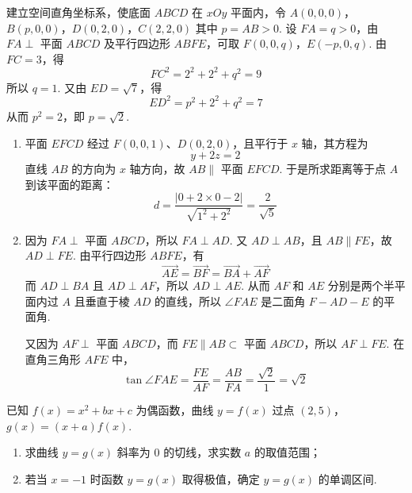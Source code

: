 \begin{solution}
建立空间直角坐标系，使底面 \(ABCD\) 在 \(xOy\) 平面内，令
\(A(0,0,0)\)，\(B(p,0,0)\)，\(D(0,2,0)\)，\(C(2,2,0)\)
其中 \(p=AB>0\). 设 \(FA=q>0\)，由 \(FA\perp\) 平面 \(ABCD\) 及平行四边形 \(ABFE\)，可取
\(F(0,0,q)\)，\(E(-p,0,q)\).
由 \(FC=3\)，得
\[
FC^2=2^2+2^2+q^2=9
\]
所以 \(q=1\). 又由 \(ED=\sqrt7\)，得
\[
ED^2=p^2+2^2+q^2=7
\]
从而 \(p^2=2\)，即 \(p=\sqrt2\).

\begin{enumerate}
\item 平面 \(EFCD\) 经过 \(F(0,0,1)\)、\(D(0,2,0)\)，且平行于 \(x\) 轴，其方程为
\[
y+2z=2
\]
直线 \(AB\) 的方向为 \(x\) 轴方向，故 \(AB\parallel\) 平面 \(EFCD\). 于是所求距离等于点 \(A\) 到该平面的距离：
\[
d=\frac{|0+2\times0-2|}{\sqrt{1^2+2^2}}=\frac2{\sqrt5}
\]

\item 因为 \(FA\perp\) 平面 \(ABCD\)，所以 \(FA\perp AD\). 又 \(AD\perp AB\)，且 \(AB\parallel FE\)，故 \(AD\perp FE\). 由平行四边形 \(ABFE\)，有
\[
\overrightarrow{AE}=\overrightarrow{BF}=\overrightarrow{BA}+\overrightarrow{AF}
\]
而 \(AD\perp BA\) 且 \(AD\perp AF\)，所以 \(AD\perp AE\). 从而 \(AF\) 和 \(AE\) 分别是两个半平面内过 \(A\) 且垂直于棱 \(AD\) 的直线，所以 \(\angle FAE\) 是二面角 \(F-AD-E\) 的平面角.

又因为 \(AF\perp\) 平面 \(ABCD\)，而 \(FE\parallel AB\subset\) 平面 \(ABCD\)，所以 \(AF\perp FE\). 在直角三角形 \(AFE\) 中，
\[
\tan\angle FAE=\frac{FE}{AF}=\frac{AB}{FA}=\frac{\sqrt2}{1}=\sqrt2
\]
\end{enumerate}
\end{solution}

\begin{problem}
已知 \(f(x)=x^2+bx+c\) 为偶函数，曲线 \(y=f(x)\) 过点 \((2,5)\)，\(g(x)=(x+a)f(x)\).
\begin{enumerate}
\item 求曲线 \(y=g(x)\) 斜率为 \(0\) 的切线，求实数 \(a\) 的取值范围；
\item 若当 \(x=-1\) 时函数 \(y=g(x)\) 取得极值，确定 \(y=g(x)\) 的单调区间.
\end{enumerate}
\end{problem}

